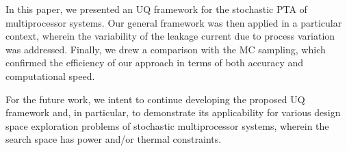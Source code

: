 In this paper, we presented an UQ framework for the stochastic PTA of multiprocessor systems. Our general framework was then applied in a particular context, wherein the variability of the leakage current due to process variation was addressed. Finally, we drew a comparison with the MC sampling, which confirmed the efficiency of our approach in terms of both accuracy and computational speed.

For the future work, we intent to continue developing the proposed UQ framework and, in particular, to demonstrate its applicability for various design space exploration problems of stochastic multiprocessor systems, wherein the search space has power and/or thermal constraints.
